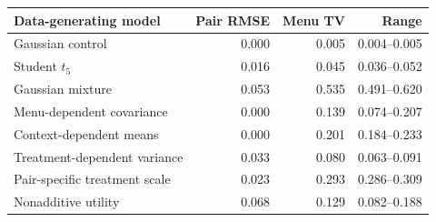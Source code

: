 \begin{tabular}{lrrr}
\toprule
Data-generating model & Pair RMSE & Menu TV & Range \\
\midrule
Gaussian control & 0.000 & 0.005 & 0.004--0.005 \\
Student $t_5$ & 0.016 & 0.045 & 0.036--0.052 \\
Gaussian mixture & 0.053 & 0.535 & 0.491--0.620 \\
Menu-dependent covariance & 0.000 & 0.139 & 0.074--0.207 \\
Context-dependent means & 0.000 & 0.201 & 0.184--0.233 \\
Treatment-dependent variance & 0.033 & 0.080 & 0.063--0.091 \\
Pair-specific treatment scale & 0.023 & 0.293 & 0.286--0.309 \\
Nonadditive utility & 0.068 & 0.129 & 0.082--0.188 \\
\bottomrule
\end{tabular}
